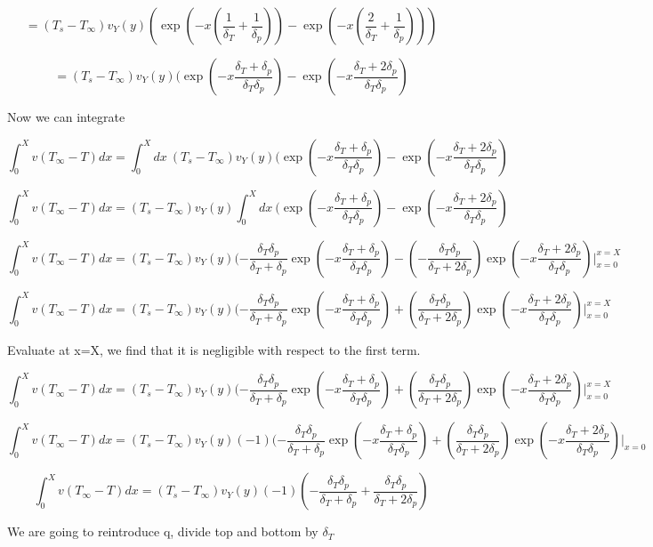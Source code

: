 \documentclass[11pt]{article}
\begin{document}
$$ = (T_s -T_\infty)v_Y (y)   (\exp (-x(\frac{1}{\delta_T}+\frac{1}{\delta_p}))- \exp (-x(\frac{2}{\delta_T}+\frac{1}{\delta_p})))$$

$$ = (T_s -T_\infty)v_Y (y)   (\exp (-x\frac{\delta_T + \delta_p}{\delta_T \delta_p})- \exp (-x\frac{\delta_T + 2\delta_p}{\delta_T \delta_p})$$

Now we can integrate


$$\int_0^X v (T_\infty - T) dx  = \int_0^X  dx \  (T_s -T_\infty)v_Y (y)   (\exp (-x\frac{\delta_T + \delta_p}{\delta_T \delta_p})- \exp (-x\frac{\delta_T + 2\delta_p}{\delta_T \delta_p})$$


$$\int_0^X v (T_\infty - T) dx  =(T_s -T_\infty)v_Y (y) \int_0^X  dx \     (\exp (-x\frac{\delta_T + \delta_p}{\delta_T \delta_p})- \exp (-x\frac{\delta_T + 2\delta_p}{\delta_T \delta_p})$$

$$\int_0^X v (T_\infty - T) dx  =(T_s -T_\infty)v_Y (y)   ( -\frac{\delta_T  \delta_p}{\delta_T + \delta_p} \exp (-x\frac{\delta_T + \delta_p}{\delta_T \delta_p})-(-\frac{\delta_T  \delta_p}{\delta_T + 2\delta_p}) \exp (-x\frac{\delta_T +2 \delta_p}{\delta_T \delta_p})|_{x=0}^{x=X}$$

$$\int_0^X v (T_\infty - T) dx  =(T_s -T_\infty)v_Y (y)   ( -\frac{\delta_T  \delta_p}{\delta_T + \delta_p} \exp (-x\frac{\delta_T + \delta_p}{\delta_T \delta_p})+(\frac{\delta_T  \delta_p}{\delta_T + 2\delta_p}) \exp (-x\frac{\delta_T +2 \delta_p}{\delta_T \delta_p})|_{x=0}^{x=X}$$


Evaluate at x=X, we find that it is negligible with respect to the first term.


$$\int_0^X v (T_\infty - T) dx  =(T_s -T_\infty)v_Y (y)   ( -\frac{\delta_T  \delta_p}{\delta_T + \delta_p} \exp (-x\frac{\delta_T + \delta_p}{\delta_T \delta_p})+(\frac{\delta_T  \delta_p}{\delta_T + 2\delta_p}) \exp (-x\frac{\delta_T +2 \delta_p}{\delta_T \delta_p})|_{x=0}^{x=X}$$

$$\int_0^X v (T_\infty - T) dx  =(T_s -T_\infty)v_Y (y) (-1)  ( -\frac{\delta_T  \delta_p}{\delta_T + \delta_p} \exp (-x\frac{\delta_T + \delta_p}{\delta_T \delta_p})+(\frac{\delta_T  \delta_p}{\delta_T + 2\delta_p}) \exp (-x\frac{\delta_T +2 \delta_p}{\delta_T \delta_p})|_{x=0}$$

$$\int_0^X v (T_\infty - T) dx  =(T_s -T_\infty)v_Y (y) (-1) ( -\frac{\delta_T  \delta_p}{\delta_T + \delta_p} +\frac{\delta_T  \delta_p}{\delta_T + 2\delta_p} )$$

We are going to reintroduce q, divide top and bottom by $\delta_T$
\end{document}
